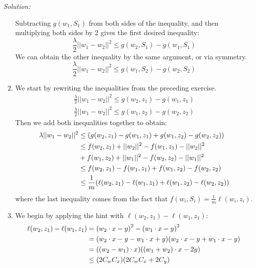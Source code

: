 \documentclass[
	10pt, %
	a4paper, %
	oneside, %
	headinclude,footinclude, %
	BCOR5mm, %
]{scrartcl}
\newenvironment{solution}
{\textit{Solution:}}
{}
\begin{document}
\begin{solution}
\begin{enumerate}
		      Subtracting $g(w_1, S_1)$ from both sides of the inequality, and then multiplying both sides by 2 gives the first desired inequality:
		      \[\frac{\lambda}{2}||w_1-w_2||^2 \leq g(w_2,S_1)-g(w_1, S_1)\]
		      We can obtain the other inequality by the same argument, or via symmetry.
		      \[\frac{\lambda}{2}||w_1-w_2||^2 \leq g(w_1,S_2)-g(w_2, S_2)\]
		\item We start by rewriting the inequalities from the preceding exercise.
		      \begin{align*}
			      \frac{\lambda}{2}||w_1-w_2||^2 \leq g(w_2, z_1)-g(w_1, z_1) \\
			      \frac{\lambda}{2}||w_1-w_2||^2 \leq g(w_1, z_2)-g(w_2, z_2)
		      \end{align*}
		      Then we add both inequalities together to obtain:
		      \begin{align*}
			      \lambda ||w_1-w_2||^2            & \leq (g(w_2,z_1)-g(w_1,z_1)+g(w_1,z_2)-g(w_2,z_2))                         \\
			      \hphantom{\lambda ||w_1-w_2||^2} & \leq f(w_2,z_1) + ||w_2||^2 -f(w_1,z_1) - ||w_2||^2                        \\
			      \hphantom{\lambda ||w_1-w_2||^2} & +f(w_1,z_2) + ||w_1||^2-f(w_2,z_2) - ||w_1||^2                             \\
			                                       & \leq f(w_2,z_1)-f(w_1,z_1)+f(w_1,z_2)-f(w_2,z_2)                           \\
			                                       & \leq \frac{1}{m} (\ell(w_2,z_1)-\ell(w_1,z_1)+\ell(w_1,z_2)-\ell(w_2,z_2))
		      \end{align*}
		      where the last inequality comes from the fact that $f(w_i,S_i) = \frac{1}{m}\ell(w_i, z_i)$.
		\item We begin by applying the hint with $\ell(w_2,z_1) - \ell(w_1,z_1)$:
		      \begin{align*}
			      \ell(w_2,z_1) - \ell(w_1,z_1)            & = {(w_2\cdot x - y)}^2 - {(w_1\cdot x - y)}^2                        \\
			      \hphantom{\ell(w_2,z_1) - \ell(w_1,z_1)} & = (w_2\cdot x - y - w_1\cdot x + y)(w_2\cdot x - y + w_1\cdot x - y) \\
			      \hphantom{\ell(w_2,z_1) - \ell(w_1,z_1)} & = ((w_2 - w_1)\cdot x)((w_1 + w_2)\cdot x - 2y)                      \\
			      \hphantom{\ell(w_2,z_1) - \ell(w_1,z_1)} & \leq (2C_w C_x)(2C_w C_x+2C_y)                                       \\

\end{align*}
\end{enumerate}
\end{solution}
\end{document}
